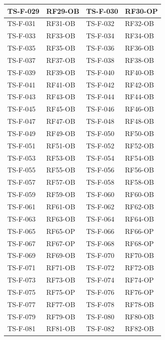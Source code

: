 \documentclass[a4paper,12pt]{article}
\begin{document}
{\begin{longtable}{|p{2.5cm}|p{2.2cm}|p{2.5cm}|p{2.2cm}|}
    \hline
    TS-F-029 & RF29-OB & TS-F-030 & RF30-OP \\
    \hline
    TS-F-031 & RF31-OB & TS-F-032 & RF32-OB \\
    \hline
    TS-F-033 & RF33-OB & TS-F-034 & RF34-OB \\
    \hline
    TS-F-035 & RF35-OB & TS-F-036 & RF36-OB \\
    \hline
    TS-F-037 & RF37-OB & TS-F-038 & RF38-OB \\
    \hline
    TS-F-039 & RF39-OB & TS-F-040 & RF40-OB \\
    \hline
    TS-F-041 & RF41-OB & TS-F-042 & RF42-OB \\
    \hline
    TS-F-043 & RF43-OB & TS-F-044 & RF44-OB \\
    \hline
    TS-F-045 & RF45-OB & TS-F-046 & RF46-OB \\
    \hline
    TS-F-047 & RF47-OB & TS-F-048 & RF48-OB \\
    \hline
    TS-F-049 & RF49-OB & TS-F-050 & RF50-OB \\
    \hline
    TS-F-051 & RF51-OB & TS-F-052 & RF52-OB \\
    \hline
    TS-F-053 & RF53-OB & TS-F-054 & RF54-OB \\
    \hline
    TS-F-055 & RF55-OB & TS-F-056 & RF56-OB \\
    \hline
    TS-F-057 & RF57-OB & TS-F-058 & RF58-OB \\
    \hline
    TS-F-059 & RF59-OB & TS-F-060 & RF60-OB \\
    \hline
    TS-F-061 & RF61-OB & TS-F-062 & RF62-OB \\
    \hline
    TS-F-063 & RF63-OB & TS-F-064 & RF64-OB \\
    \hline
    TS-F-065 & RF65-OP & TS-F-066 & RF66-OP \\
    \hline
    TS-F-067 & RF67-OP & TS-F-068 & RF68-OP \\
    \hline
    TS-F-069 & RF69-OB & TS-F-070 & RF70-OB \\
    \hline
    TS-F-071 & RF71-OB & TS-F-072 & RF72-OB \\
    \hline
    TS-F-073 & RF73-OB & TS-F-074 & RF74-OP \\
    \hline
    TS-F-075 & RF75-OP & TS-F-076 & RF76-OP \\
    \hline
    TS-F-077 & RF77-OB & TS-F-078 & RF78-OB \\
    \hline
    TS-F-079 & RF79-OB & TS-F-080 & RF80-OB \\
    \hline
    TS-F-081 & RF81-OB & TS-F-082 & RF82-OB \\

\end{longtable}}
\end{document}
